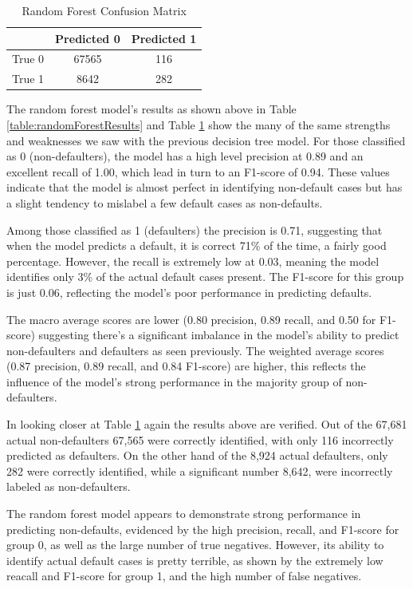 \documentclass[12pt]{article}
\begin{document}
\begin{table}[htbp]
    \centering
    \caption{Random Forest Confusion Matrix}
    \begin{tabular}{lcc}
        \toprule
        & Predicted 0 & Predicted 1 \\
        \midrule
        True 0 & 67565 & 116 \\
        True 1 & 8642 & 282 \\
        \bottomrule
    \end{tabular}
    \label{table:randomForestConfusionMatrix}
\end{table}

The random forest model's results as shown above in Table \ref{table:randomForestResults} and Table \ref{table:randomForestConfusionMatrix} show the many of the same strengths and weaknesses we saw with the previous decision tree model. For those classified as 0 (non-defaulters), the model has a high level precision at 0.89 and an excellent recall of 1.00, which lead in turn to an F1-score of 0.94. These values indicate that the model is almost perfect in identifying non-default cases but has a slight tendency to mislabel a few default cases as non-defaults.

Among those classified as 1 (defaulters) the precision is 0.71, suggesting that when the model predicts a default, it is correct 71\% of the time, a fairly good percentage. However, the recall is extremely low at 0.03, meaning the model identifies only 3\% of the actual default cases present. The F1-score for this group is just 0.06, reflecting the model's poor performance in predicting defaults.

The macro average scores are lower (0.80 precision, 0.89 recall, and 0.50 for F1-score) suggesting there's a significant imbalance in the model's ability to predict non-defaulters and defaulters as seen previously. The weighted average scores (0.87 precision, 0.89 recall, and 0.84 F1-score) are higher, this reflects the influence of the model's strong performance in the majority group of non-defaulters.

In looking closer at Table \ref{table:randomForestConfusionMatrix} again the results above are verified. Out of the 67,681 actual non-defaulters 67,565 were correctly identified, with only 116 incorrectly predicted as defaulters. On the other hand of the 8,924 actual defaulters, only 282 were correctly identified, while a significant number 8,642, were incorrectly labeled as non-defaulters.

The random forest model appears to demonstrate strong performance in predicting non-defaults, evidenced by the high precision, recall, and F1-score for group 0, as well as the large number of true negatives. However, its ability to identify actual default cases is pretty terrible, as shown by the extremely low reacall and F1-score for group 1, and the high number of false negatives.
\end{document}
